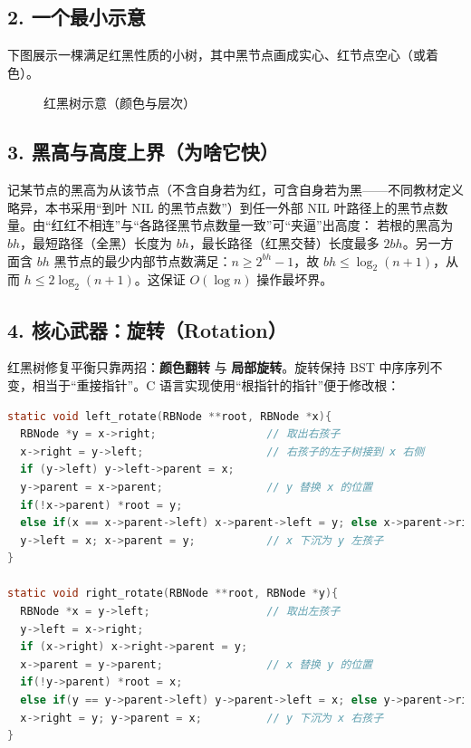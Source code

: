 \documentclass[lang=cn,newtx,10pt,scheme=chinese]{../elegantbook}
\begin{document}
\subsection{2. 一个最小示意}下图展示一棵满足红黑性质的小树，其中黑节点画成实心、红节点空心（或着色）。

\begin{figure}[!htbp]
  \centering
  \caption{红黑树示意（颜色与层次）}
\end{figure}

\subsection{3. 黑高与高度上界（为啥它快）}
记某节点的黑高为从该节点（不含自身若为红，可含自身若为黑——不同教材定义略异，本书采用“到叶 NIL 的黑节点数”）到任一外部 NIL 叶路径上的黑节点数量。由“红红不相连”与“各路径黑节点数量一致”可“夹逼”出高度：
若根的黑高为 \(bh\)，最短路径（全黑）长度为 \(bh\)，最长路径（红黑交替）长度最多 \(2bh\)。另一方面含 \(bh\) 黑节点的最少内部节点数满足：\(n \ge 2^{bh}-1\)，故 \(bh \le \log_2(n+1)\)，从而 \(h \le 2\log_2(n+1)\)。这保证 \(O(\log n)\) 操作最坏界。

\subsection{4. 核心武器：旋转（Rotation）}
红黑树修复平衡只靠两招：\textbf{颜色翻转} 与 \textbf{局部旋转}。旋转保持 BST 中序序列不变，相当于“重接指针”。C 语言实现使用“根指针的指针”便于修改根：
\begin{lstlisting}[language=C]
static void left_rotate(RBNode **root, RBNode *x){
  RBNode *y = x->right;                 // 取出右孩子
  x->right = y->left;                   // 右孩子的左子树接到 x 右侧
  if (y->left) y->left->parent = x;
  y->parent = x->parent;                // y 替换 x 的位置
  if(!x->parent) *root = y;
  else if(x == x->parent->left) x->parent->left = y; else x->parent->right = y;
  y->left = x; x->parent = y;           // x 下沉为 y 左孩子
}

static void right_rotate(RBNode **root, RBNode *y){
  RBNode *x = y->left;                  // 取出左孩子
  y->left = x->right;
  if (x->right) x->right->parent = y;
  x->parent = y->parent;                // x 替换 y 的位置
  if(!y->parent) *root = x;
  else if(y == y->parent->left) y->parent->left = x; else y->parent->right = x;
  x->right = y; y->parent = x;          // y 下沉为 x 右孩子
}
\end{lstlisting}
\end{document}
